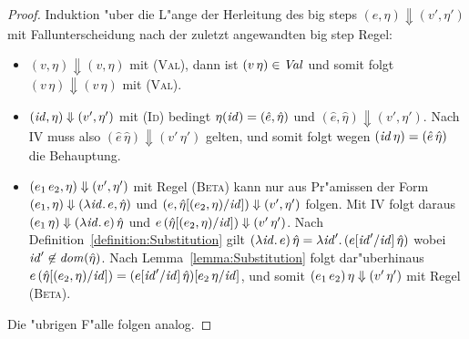 \documentclass[12pt,fleqn]{article}
\newcommand{\RN}[1]{\mbox{\textsc{(#1)}}}
\begin{document}
\begin{proof}
  Induktion "uber die L"ange der Herleitung des big steps $(e,\eta) \Downarrow (v',\eta')$ mit Fallunterscheidung
  nach der zuletzt angewandten big step Regel:
  \begin{itemize}
    \item $(v,\eta) \Downarrow (v,\eta)$ mit \RN{Val}, dann ist $(v\,\eta) \in {\text{\it Val\/}}$ und somit folgt
          $(v\,\eta) \Downarrow (v\,\eta)$ mit \RN{Val}.

    \item $({\text{\it id\/}},\eta) \Downarrow (v',\eta')$ mit \RN{Id} bedingt $\eta({\text{\it id\/}}) = (\hat{e},\hat{\eta})$ und
          $(\hat{e},\hat{\eta}) \Downarrow (v',\eta')$. Nach IV muss also $(\hat{e}\,\hat{\eta})\Downarrow(v'\,\eta')$
          gelten, und somit folgt wegen $({\text{\it id\/}}\,\eta) = (\hat{e}\,\hat{\eta})$ die Behauptung.

    \item $(e_1\,e_2,\eta) \Downarrow (v',\eta')$ mit Regel \RN{Beta} kann nur aus Pr"amissen der Form
          $(e_1,\eta) \Downarrow (\lambda {\text{\it id\/}}.\,e,\hat{\eta})$ und $(e,\hat{\eta}[(e_2,\eta)/{\text{\it id\/}}])\Downarrow(v',\eta')$
          folgen. Mit IV folgt daraus $(e_1\,\eta) \Downarrow (\lambda {\text{\it id\/}}.\,e)\,\hat{\eta}$ und
          $e\,(\hat{\eta}[(e_2,\eta)/{\text{\it id\/}}])\Downarrow(v'\,\eta')$. Nach Definition~\ref{definition:Substitution}
          gilt $(\lambda {\text{\it id\/}}.\,e)\,\hat{\eta} = \lambda {\text{\it id\/}}'.\,(e[{\text{\it id\/}}'/{\text{\it id\/}}]\,\hat{\eta})$ wobei
          ${\text{\it id\/}}'\not\in{\text{\it dom\/}}(\hat{\eta})$. Nach Lemma~\ref{lemma:Substitution} folgt dar"uberhinaus
          $e\,(\hat{\eta}[(e_2,\eta)/{\text{\it id\/}}]) = (e[{\text{\it id\/}}'/{\text{\it id\/}}]\,\hat{\eta})[e_2\,\eta/{\text{\it id\/}}]$, und somit
          $(e_1\,e_2)\,\eta \Downarrow (v'\,\eta')$ mit Regel \RN{Beta}.

  \end{itemize}
  Die "ubrigen F"alle folgen analog.
\end{proof}
\end{document}
